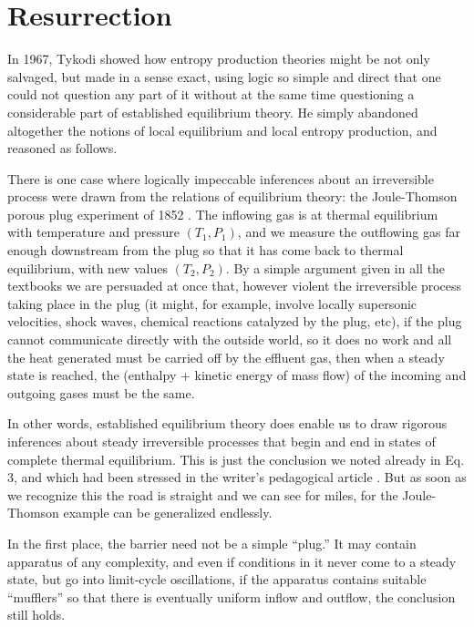 \documentclass{article}
\begin{document}
\section{Resurrection}

In 1967, Tykodi \cite{tykodi1967} showed how entropy production theories might be not only salvaged, but made in a sense exact, using logic so simple and direct that one could not question any part of it without at the same time questioning a considerable part of established equilibrium theory. He simply abandoned altogether the notions of local equilibrium and local entropy production, and reasoned as follows.

There is one case where logically impeccable inferences about an irreversible process were drawn from the relations of equilibrium theory: the Joule-Thomson porous plug experiment of 1852 . The inflowing gas is at thermal equilibrium with temperature and pressure $\left(T_1, P_1\right)$, and we measure the outflowing gas far enough downstream from the plug so that it has come back to thermal equilibrium, with new values $\left(T_2, P_2\right)$. By a simple argument given in all the textbooks we are persuaded at once that, however violent the irreversible process taking place in the plug (it might, for example, involve locally supersonic velocities, shock waves, chemical reactions catalyzed by the plug, etc), if the plug cannot communicate directly with the outside world, so it does no work and all the heat generated must be carried off by the effluent gas, then when a steady state is reached, the (enthalpy + kinetic energy of mass flow) of the incoming and outgoing gases must be the same.

In other words, established equilibrium theory does enable us to draw rigorous inferences about steady irreversible processes that begin and end in states of complete thermal equilibrium. This is just the conclusion we noted already in Eq. 3, and which had been stressed in the writer's pedagogical article \cite{jaynes1965}. But as soon as we recognize this the road is straight and we can see for miles, for the Joule-Thomson example can be generalized endlessly.

In the first place, the barrier need not be a simple ``plug.'' It may contain apparatus of any complexity, and even if conditions in it never come to a steady state, but go into limit-cycle oscillations, if the apparatus contains suitable ``mufflers'' so that there is eventually uniform inflow and outflow, the conclusion still holds.
\end{document}

